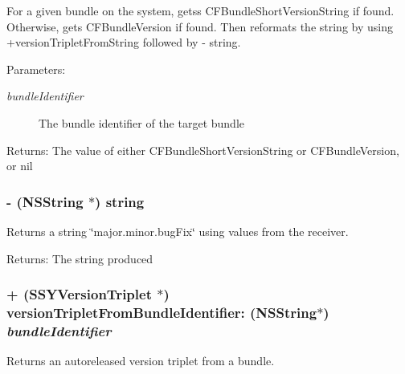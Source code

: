 For a given bundle on the system, getss CFBundleShortVersionString if found. Otherwise, gets CFBundleVersion if found. Then reformats the string by using +versionTripletFromString followed by - string. 

\begin{Desc}
\item[Parameters:]
\begin{description}
\item[{\em bundleIdentifier}]The bundle identifier of the target bundle \end{description}
\end{Desc}
\begin{Desc}
\item[Returns:]The value of either CFBundleShortVersionString or CFBundleVersion, or nil \end{Desc}
\hypertarget{interface_s_s_y_version_triplet_b3561f24707f66e4829df0ca7a6e7c65}{
\subsubsection[{string}]{\setlength{\rightskip}{0pt plus 5cm}- (NSString $\ast$) string }}
\label{interface_s_s_y_version_triplet_b3561f24707f66e4829df0ca7a6e7c65}


Returns a string \char`\"{}major.minor.bugFix\char`\"{} using values from the receiver. 

\begin{Desc}
\item[Returns:]The string produced \end{Desc}
\hypertarget{interface_s_s_y_version_triplet_2bfb684acb045a630eaedf693da0d268}{
\subsubsection[{versionTripletFromBundleIdentifier:}]{\setlength{\rightskip}{0pt plus 5cm}+ ({\bf SSYVersionTriplet} $\ast$) versionTripletFromBundleIdentifier: (NSString$\ast$) {\em bundleIdentifier}}}
\label{interface_s_s_y_version_triplet_2bfb684acb045a630eaedf693da0d268}


Returns an autoreleased version triplet from a bundle. 

